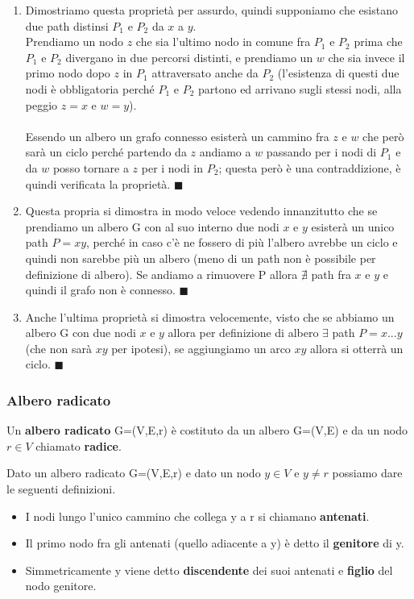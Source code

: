 \begin{demostration}
\begin{enumerate}
    \item Dimostriamo questa proprietà per assurdo, quindi supponiamo che esistano due path distinsi $P_1$ e $P_2$ da $x$ a $y$. \\
    Prendiamo un nodo $z$ che sia l'ultimo nodo in comune fra $P_1$ e $P_2$ prima che $P_1$ e $P_2$ divergano in due percorsi distinti, e prendiamo un $w$ che sia invece il primo nodo dopo $z$ in $P_1$ attraversato anche da $P_2$ (l'esistenza di questi due nodi è obbligatoria perché $P_1$ e $P_2$ partono ed arrivano sugli stessi nodi, alla peggio $z = x$ e $w = y$). \\\\
    Essendo un albero un grafo connesso esisterà un cammino fra $z$ e $w$ che però sarà un ciclo perché partendo da $z$ andiamo a $w$ passando per i nodi di $P_1$ e da $w$ posso tornare a $z$ per i nodi in $P_2$; questa però è una contraddizione, è quindi verificata la proprietà. $\blacksquare$ 
    \item Questa propria si dimostra in modo veloce vedendo innanzitutto che se prendiamo un albero G con al suo interno due nodi $x$ e $y$ esisterà un unico path $P = xy$, perché in caso c'è ne fossero di più l'albero avrebbe un ciclo e quindi non sarebbe più un albero (meno di un path non è possibile per definizione di albero). Se andiamo a rimuovere P allora $\nexists$ path fra $x$ e $y$ e quindi il grafo non è connesso. $\blacksquare$
    \item Anche l'ultima proprietà si dimostra velocemente, visto che se abbiamo un albero G con due nodi $x$ e $y$ allora per definizione di albero $\exists$ path $P = x...y$ (che non sarà $xy$ per ipotesi), se aggiungiamo un arco $xy$ allora si otterrà un ciclo. $\blacksquare$
\end{enumerate}
\end{demostration}

\subsubsection{Albero radicato}
\begin{definition}
    Un \textbf{albero radicato} G=(V,E,r) è costituto da un albero G=(V,E) e da un nodo $r\in V$ chiamato \textbf{radice}.
\end{definition}

\begin{definition}
    Dato un albero radicato G=(V,E,r) e dato un nodo $y \in V$ e $y \neq r$ possiamo dare le seguenti definizioni.
    \begin{itemize}
        \item I nodi lungo l'unico cammino che collega y a r si chiamano \textbf{antenati}.
        \item Il primo nodo fra gli antenati (quello adiacente a y) è detto il \textbf{genitore} di y.
        \item Simmetricamente y viene detto \textbf{discendente} dei suoi antenati e \textbf{figlio} del nodo genitore.
    \end{itemize}
\end{definition}

